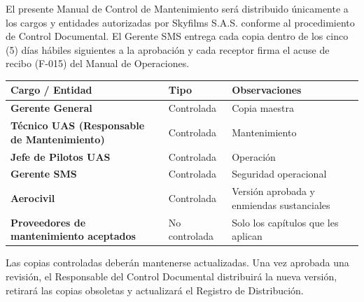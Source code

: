 

El presente Manual de Control de Mantenimiento será distribuido únicamente a los cargos y entidades autorizadas por Skyfilms S.A.S. conforme al procedimiento de Control Documental. El Gerente SMS entrega cada copia dentro de los cinco (5) días hábiles siguientes a la aprobación y cada receptor firma el acuse de recibo (F-015) del Manual de Operaciones.

\vspace{0.3cm}

\renewcommand{\arraystretch}{1.1}
\setlength{\tabcolsep}{5pt}

\begin{table}[H]
\centering

\begin{tabularx}{\textwidth}{
>{\bfseries}p{6.2cm}
>{\centering\arraybackslash}p{2.6cm}
X}

\toprule

Cargo / Entidad &
Tipo &
Observaciones

\\

\midrule

Gerente General &
Controlada &
Copia maestra

\\

Técnico UAS (Responsable de Mantenimiento) &
Controlada &
Mantenimiento

\\

Jefe de Pilotos UAS &
Controlada &
Operación

\\

Gerente SMS &
Controlada &
Seguridad operacional

\\

Aerocivil &
Controlada &
Versión aprobada y enmiendas sustanciales

\\

Proveedores de mantenimiento aceptados &
No controlada &
Solo los capítulos que les aplican

\\

\bottomrule

\end{tabularx}

\end{table}

\vspace{0.3cm}

\begin{tcolorbox}[
colback=gray!5,
colframe=black,
title=Control de Distribución]

Las copias controladas deberán mantenerse actualizadas. Una vez aprobada una revisión, el Responsable del Control Documental distribuirá la nueva versión, retirará las copias obsoletas y actualizará el Registro de Distribución.

\end{tcolorbox}
